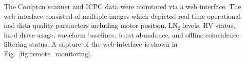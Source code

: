 The Compton scanner and ICPC data were monitored via a web interface. The web interface consisted of multiple images which depicted real time operational and data quality parameters including motor position, LN$_2$ levels, HV status, hard drive usage, waveform baselines, burst abundance, and offline coincidence filtering status. A capture of the web interface is shown in Fig.~\ref{fig:remote_monitoring}.